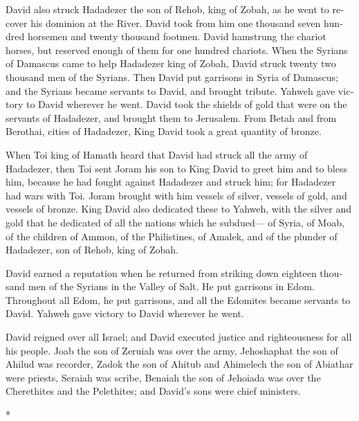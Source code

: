 \begin{paracol}{2}
\begin{otherlanguage}{english}
 David also struck Hadadezer the son of Rehob, king of
Zobah, as he went to recover his dominion at the River. 
David took from him one thousand seven hundred horsemen and twenty
thousand footmen. David hamstrung the chariot horses, but reserved
enough of them for one hundred chariots.  When the Syrians
of Damascus came to help Hadadezer king of Zobah, David struck twenty
two thousand men of the Syrians.  Then David put garrisons
in Syria of Damascus; and the Syrians became servants to David, and
brought tribute. Yahweh gave victory to David wherever he went.
 David took the shields of gold that were on the servants
of Hadadezer, and brought them to Jerusalem.  From Betah
and from Berothai, cities of Hadadezer, King David took a great quantity
of bronze.

 When Toi king of Hamath heard that David had struck all
the army of Hadadezer,  then Toi sent Joram his son to
King David to greet him and to bless him, because he had fought against
Hadadezer and struck him; for Hadadezer had wars with Toi. Joram brought
with him vessels of silver, vessels of gold, and vessels of bronze.
 King David also dedicated these to Yahweh, with the
silver and gold that he dedicated of all the nations which he subdued---
 of Syria, of Moab, of the children of Ammon, of the
Philistines, of Amalek, and of the plunder of Hadadezer, son of Rehob,
king of Zobah.

 David earned a reputation when he returned from striking
down eighteen thousand men of the Syrians in the Valley of Salt.
 He put garrisons in Edom. Throughout all Edom, he put
garrisons, and all the Edomites became servants to David. Yahweh gave
victory to David wherever he went.

 David reigned over all Israel; and David executed
justice and righteousness for all his people.  Joab the
son of Zeruiah was over the army, Jehoshaphat the son of Ahilud was
recorder,  Zadok the son of Ahitub and Ahimelech the son
of Abiathar were priests, Seraiah was scribe,  Benaiah
the son of Jehoiada was over the Cherethites and the Pelethites; and
David's sons were chief ministers.

\end{otherlanguage}

\switchcolumn[0]*

\hypertarget{la-generosidad-de-david-hacia-el-hijo-de-jonatuxe1n-mefiboset}{%
}
\end{paracol}
